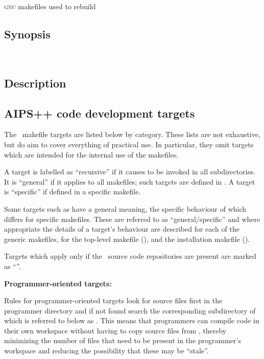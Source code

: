 \textsc{gnu} makefiles used to rebuild \aipspp\ 

\subsection*{Synopsis}

\begin{synopsis}
   \\
\end{synopsis}

\subsection*{Description}

\subsection*{AIPS++ code development targets}

The \aipspp\ makefile targets are listed below by category.  These lists
are not exhaustive, but do aim to cover everything of practical use.  In
particular, they omit targets which are intended for the internal use of the
makefiles.

A target is labelled as ``recursive'' if it causes  to be
invoked in all subdirectories.  It is ``general'' if it applies to all
makefiles; such targets are defined in .  A target is
``specific'' if defined in a specific makefile.

Some targets such as  have a general meaning, the specific
behaviour of which differs for specific makefiles.  These are referred to as
``general/specific'' and where appropriate the details of a target's behaviour
are described for each of the generic makefiles, for the top-level makefile
(), and the installation makefile ().

Targets which apply only if the \rcs\ source code repositories are present
are marked as ``\rcs''.


\textbf{Programmer-oriented targets:}

Rules for programmer-oriented targets look for source files first in the
programmer directory and if not found search the corresponding subdirectory of
 which is referred to below as .  This means
that programmers can compile code in their own workspace without having to
copy source files from , thereby minimizing the number of
files that need to be present in the programmer's workspace and reducing the
possibility that these may be ``stale''.


